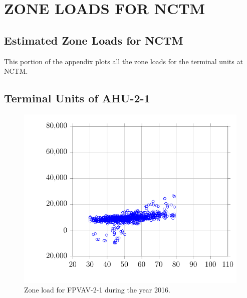 %
%
%


\chapter{\texorpdfstring{\MakeUppercase{ZONE LOADS FOR NCTM}}{Zone Loads
for NCTM}}

\section{Estimated Zone Loads for NCTM}

This portion of the appendix plots all the zone loads for the terminal
units at NCTM. 

\newcommand{\zoneLoadAppendixPlotsCaption}[1]{Zone load for #1 during the year 2016.}

\section{Terminal Units of AHU-2-1}
\begin{figure}
    \centering
    \includegraphics{Plots/04/2017-06-27-0830-BtuhrvsOADryBulbTemperatureNOAAF.pdf}
    \caption{\zoneLoadAppendixPlotsCaption{FPVAV-2-1}}
    \label{fig:2017-06-27-0830-BtuhrvsOADryBulbTemperatureNOAAF}
\end{figure}

